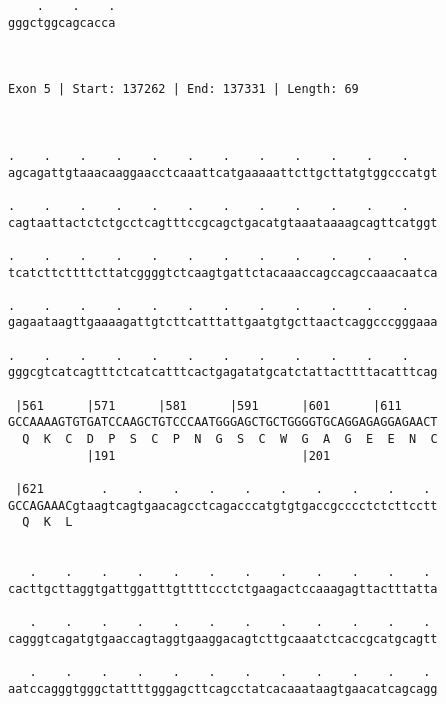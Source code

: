 \documentclass{article}
\begin{document}
\begin{Verbatim}
    .    .    .
gggctggcagcacca
               
               
 
Exon 5 | Start: 137262 | End: 137331 | Length: 69



.    .    .    .    .    .    .    .    .    .    .    .    
agcagattgtaaacaaggaacctcaaattcatgaaaaattcttgcttatgtggcccatgt
                                                            
.    .    .    .    .    .    .    .    .    .    .    .    
cagtaattactctctgcctcagtttccgcagctgacatgtaaataaaagcagttcatggt
                                                            
.    .    .    .    .    .    .    .    .    .    .    .    
tcatcttcttttcttatcggggtctcaagtgattctacaaaccagccagccaaacaatca
                                                            
.    .    .    .    .    .    .    .    .    .    .    .    
gagaataagttgaaaagattgtcttcatttattgaatgtgcttaactcaggcccgggaaa
                                                            
.    .    .    .    .    .    .    .    .    .    .    .    
gggcgtcatcagtttctcatcatttcactgagatatgcatctattacttttacatttcag
                                                            
 |561      |571      |581      |591      |601      |611     
GCCAAAAGTGTGATCCAAGCTGTCCCAATGGGAGCTGCTGGGGTGCAGGAGAGGAGAACT
  Q  K  C  D  P  S  C  P  N  G  S  C  W  G  A  G  E  E  N  C
           |191                          |201               
  
 |621        .    .    .    .    .    .    .    .    .    . 
GCCAGAAACgtaagtcagtgaacagcctcagacccatgtgtgaccgcccctctcttcctt
  Q  K  L                                                   
                                                            
  
   .    .    .    .    .    .    .    .    .    .    .    . 
cacttgcttaggtgattggatttgttttccctctgaagactccaaagagttactttatta
                                                            
   .    .    .    .    .    .    .    .    .    .    .    . 
cagggtcagatgtgaaccagtaggtgaaggacagtcttgcaaatctcaccgcatgcagtt
                                                            
   .    .    .    .    .    .    .    .    .    .    .    . 
aatccagggtgggctattttgggagcttcagcctatcacaaataagtgaacatcagcagg
                                                            

\end{Verbatim}
\end{document}
